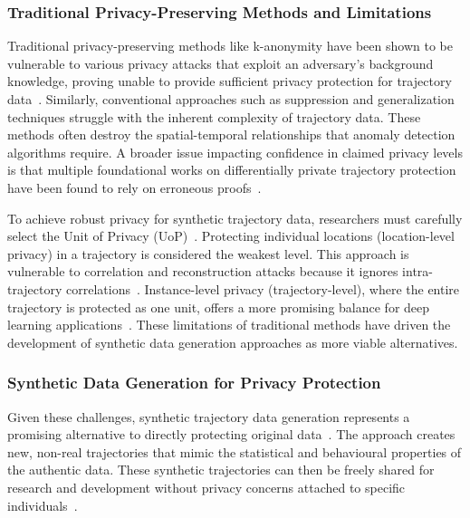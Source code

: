 \documentclass[runningheads]{llncs}
\begin{document}
\subsubsection{Traditional Privacy-Preserving Methods and Limitations}

Traditional privacy-preserving methods like k-anonymity have been shown to be vulnerable to various privacy attacks that exploit an adversary's background knowledge, proving unable to provide sufficient privacy protection for trajectory data~\cite{Chen2011DPTP,Buchholz2022RAoPT,Jin2023SurveyExpStudy}. Similarly, conventional approaches such as suppression and generalization techniques struggle with the inherent complexity of trajectory data. These methods often destroy the spatial-temporal relationships that anomaly detection algorithms require. A broader issue impacting confidence in claimed privacy levels is that multiple foundational works on differentially private trajectory protection have been found to rely on erroneous proofs~\cite{Buchholz2024SoK,Primault2014DPLPP,Errounda2019AnalysisDPLocation}.

To achieve robust privacy for synthetic trajectory data, researchers must carefully select the Unit of Privacy (UoP)~\cite{Buchholz2024SoK,Primault2019LongRoad}. Protecting individual locations (location-level privacy) in a trajectory is considered the weakest level. This approach is vulnerable to correlation and reconstruction attacks because it ignores intra-trajectory correlations~\cite{Buchholz2024SoK,Buchholz2022RAoPT,Primault2014DPLPP,Errounda2019AnalysisDPLocation}. Instance-level privacy (trajectory-level), where the entire trajectory is protected as one unit, offers a more promising balance for deep learning applications~\cite{Buchholz2024SoK}. These limitations of traditional methods have driven the development of synthetic data generation approaches as more viable alternatives.

\subsubsection{Synthetic Data Generation for Privacy Protection}

Given these challenges, synthetic trajectory data generation represents a promising alternative to directly protecting original data~\cite{Buchholz2024SoK,Rao2021LSTMTrajGAN,Liu2018TrajGANs}. The approach creates new, non-real trajectories that mimic the statistical and behavioural properties of the authentic data. These synthetic trajectories can then be freely shared for research and development without privacy concerns attached to specific individuals~\cite{Rao2021LSTMTrajGAN,Liu2018TrajGANs,Qu2020GANs5G}.
\end{document}
